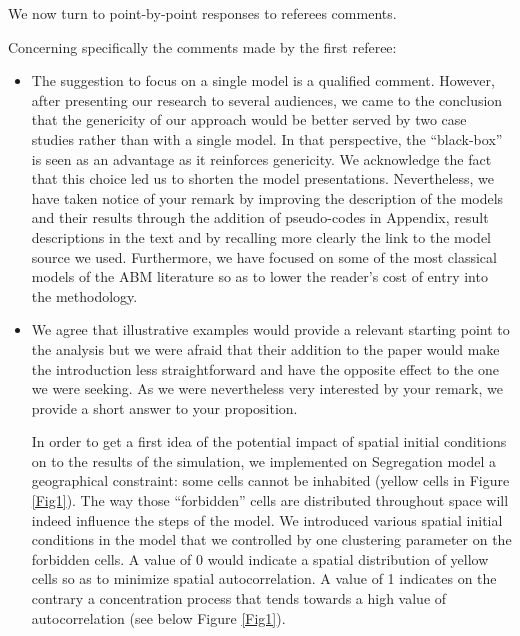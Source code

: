 \documentclass[11pt,a4paper,sans]{moderncv}        %
\begin{document}
\medskip



We now turn to point-by-point responses to referees comments.


\medskip


Concerning specifically the comments made by the first referee:

\begin{itemize}
	\item The suggestion to focus on a single model is a qualified comment. However, after presenting our research to several audiences, we came to the conclusion that the genericity of our approach would be better served by two case studies rather than with a single model. In that perspective, the ``black-box'' is seen as an advantage as it reinforces genericity. We acknowledge the fact that this choice led us to shorten the model presentations. Nevertheless, we have taken notice of your remark by improving the description of the models and their results through the addition of pseudo-codes in Appendix, result descriptions in the text and by recalling more clearly the link to the model source we used. Furthermore, we have focused on some of the most classical models of the ABM literature so as to lower the reader's cost of entry into the methodology.
   
   \item We agree that illustrative examples would provide a relevant starting point to  the analysis but we were afraid that their addition to the paper would make the introduction less straightforward and have the opposite effect to the one we were seeking. As we were nevertheless very interested by your remark, we provide a short answer to your proposition.
   
In order to get a first idea of the potential impact of spatial initial conditions on to the results of the simulation, we implemented on Segregation model a geographical constraint: some cells cannot be inhabited (yellow cells in Figure \ref{Fig1}). The way those “forbidden” cells are distributed throughout space will indeed influence the steps of the model. 
We introduced various spatial initial conditions in the model that we controlled by one clustering parameter on the forbidden cells. A value of 0 would indicate a spatial distribution of yellow cells so as to minimize spatial autocorrelation. A value of 1 indicates on the contrary a concentration process that tends towards a high value of autocorrelation (see below Figure \ref{Fig1}). 


\end{itemize}
\end{document}
